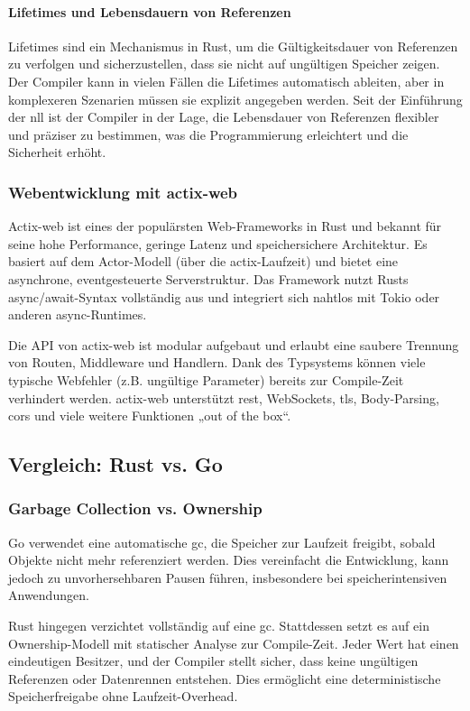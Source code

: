 \paragraph{Lifetimes und Lebensdauern von Referenzen}
Lifetimes sind ein Mechanismus in Rust, um die Gültigkeitsdauer von Referenzen zu verfolgen und sicherzustellen, dass sie nicht auf ungültigen Speicher zeigen. Der Compiler kann in vielen Fällen die Lifetimes automatisch ableiten, aber in komplexeren Szenarien müssen sie explizit angegeben werden. Seit der Einführung der \ac{nll} ist der Compiler in der Lage, die Lebensdauer von Referenzen flexibler und präziser zu bestimmen, was die Programmierung erleichtert und die Sicherheit erhöht.

\subsubsection{Webentwicklung mit actix-web}
Actix-web ist eines der populärsten Web-Frameworks in Rust und bekannt für seine hohe Performance, geringe Latenz und speichersichere Architektur. Es basiert auf dem Actor-Modell (über die actix-Laufzeit) und bietet eine asynchrone, eventgesteuerte Serverstruktur. Das Framework nutzt Rusts async/await-Syntax vollständig aus und integriert sich nahtlos mit Tokio oder anderen async-Runtimes.

Die API von actix-web ist modular aufgebaut und erlaubt eine saubere Trennung von Routen, Middleware und Handlern. Dank des Typsystems können viele typische Webfehler (z.B. ungültige Parameter) bereits zur Compile-Zeit verhindert werden. actix-web unterstützt \ac{rest}, WebSockets, \ac{tls}, Body-Parsing, \ac{cors} und viele weitere Funktionen „out of the box“.

\subsection{Vergleich: Rust vs. Go}

\subsubsection{Garbage Collection vs. Ownership}
Go verwendet eine automatische \ac{gc}, die Speicher zur Laufzeit freigibt, sobald Objekte nicht mehr referenziert werden. Dies vereinfacht die Entwicklung, kann jedoch zu unvorhersehbaren Pausen führen, insbesondere bei speicherintensiven Anwendungen. \cite{Bhavya2021}

Rust hingegen verzichtet vollständig auf eine \ac{gc}. Stattdessen setzt es auf ein Ownership-Modell mit statischer Analyse zur Compile-Zeit. Jeder Wert hat einen eindeutigen Besitzer, und der Compiler stellt sicher, dass keine ungültigen Referenzen oder Datenrennen entstehen. Dies ermöglicht eine deterministische Speicherfreigabe ohne Laufzeit-Overhead. \cite{puri2025}

